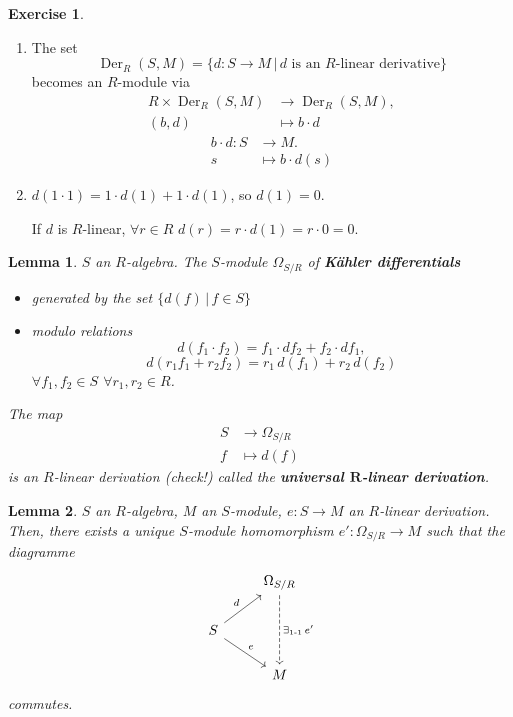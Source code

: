\documentclass[12pt]{article}
\DeclareMathOperator{\Der}{Der}
\newtheorem*{lemma}{Lemma}
\theoremstyle{definition}
\newtheorem*{exercise}{Exercise}
\begin{document}
\begin{exercise}
\begin{enumerate}[label=\arabic*)]
\item The set
\[\Der_R(S,M)=\{d:S\rightarrow M\,|\,d\text{ is an }R\text{-linear derivative}\}\]
becomes an $R$-module via
\begin{align*}
R\times\Der_R(S,M)&\longrightarrow\Der_R(S,M),\\
(b,d)&\longmapsto b\cdot d
\end{align*}
\begin{align*}
b\cdot d:S&\longrightarrow M.\\
s&\longmapsto b\cdot d(s)
\end{align*}
\item $d(1\cdot1)=1\cdot d(1)+1\cdot d(1)$, so $d(1)=0$.

If $d$ is $R$-linear, $\forall r\in R$ $d(r)=r\cdot d(1)=r\cdot0=0$.
\end{enumerate}
\end{exercise}

\begin{lemma}
$S$ an $R$-algebra. The $S$-module $\Omega_{S/R}$ of \textbf{K\"{a}hler differentials}
\begin{itemize}[label=$-$]
\item generated by the set $\{d(f)\,|\,f\in S\}$
\item modulo relations
\[d(f_1\cdot f_2)=f_1\cdot df_2+f_2\cdot df_1,\]
\[d(r_1f_1+r_2f_2)=r_1\,d(f_1)+r_2\,d(f_2)\]
$\forall f_1,f_2\in S$ $\forall r_1,r_2\in R$.
\end{itemize}

The map
\begin{align*}
S&\longrightarrow\Omega_{S/R}\\
f&\longmapsto d(f)
\end{align*}
is an $R$-linear derivation (check!) called the \textbf{universal $\boldsymbol{R}$-linear derivation}.
\end{lemma}

\begin{lemma}
$S$ an $R$-algebra, $M$ an $S$-module, $e:S\rightarrow M$ an $R$-linear derivation. Then, there exists a unique $S$-module homomorphism $e':\Omega_{S/R}\rightarrow M$ such that the diagramme
\[
\begin{tikzcd}
&\Omega_{S/R}\arrow[dd,dashed,"\exists_{1\text{-}1}\,e'"]\\
S\arrow[ru,"d"]\arrow[rd,"e"]\\
&M
\end{tikzcd}
\]
commutes.
\end{lemma}
\end{document}

